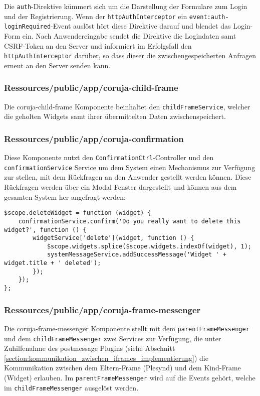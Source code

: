 Die \texttt{auth}-Direktive kümmert sich um die Darstellung der Formulare zum Login und der Registrierung. Wenn der \texttt{httpAuthInterceptor} ein \texttt{event:auth-loginRequired}-Event auslöst hört diese Direktive darauf und blendet das Login-Form ein. Nach Anwendereingabe sendet die Direktive die Logindaten samt CSRF-Token an den Server und informiert im Erfolgsfall den \texttt{httpAuthInterceptor} darüber, so dass dieser die zwischengespeicherten Anfragen erneut an den Server senden kann.

\subsubsection*{Ressources/public/app/coruja-child-frame}
Die coruja-child-frame Komponente beinhaltet den \texttt{childFrameService}, welcher die geholten Widgets samt ihrer übermittelten Daten zwischenspeichert.

\subsubsection*{Ressources/public/app/coruja-confirmation}
Diese Komponente nutzt den \texttt{ConfirmationCtrl}-Controller und den \texttt{confirmation\allowbreak Service} Service um dem System einen Mechanismus zur Verfügung zur stellen, mit dem Rückfragen an den Anwender gestellt werden können. Diese Rückfragen werden über ein Modal Fenster dargestellt und können aus dem gesamten System her angefragt werden:
\begin{lstlisting}[label=listing:confirmation_and_message]
$scope.deleteWidget = function (widget) {
    confirmationService.confirm('Do you really want to delete this widget?', function () {
        widgetService['delete'](widget, function () {
            $scope.widgets.splice($scope.widgets.indexOf(widget), 1);
            systemMessageService.addSuccessMessage('Widget ' + widget.title + ' deleted');
        });
    });
};
\end{lstlisting}

\subsubsection*{Ressources/public/app/coruja-frame-messenger}
Die coruja-frame-messenger Komponente stellt mit dem \texttt{parentFrameMessenger} und dem \texttt{childFrameMessenger} zwei Services zur Verfügung, die unter Zuhilfenahme des postmessage Plugins (siehe Abschnitt \ref{section:kommunikation_zwischen_iframes_implementierung}) die Kommunikation zwischen dem Eltern-Frame (Plesynd) und dem Kind-Frame (Widget) erlauben. Im \texttt{parentFrameMessenger} wird auf die Events gehört, welche im \texttt{childFrameMessenger} ausgelöst werden.

